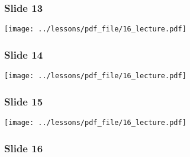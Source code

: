 \documentclass[../main/main.tex]{subfiles}
\begin{document}
\subsubsection*{Slide 13}

\begin{minipage}[]{0.5\linewidth}
\centering
\texttt{[image: ../lessons/pdf\_file/16\_lecture.pdf]}
\end{minipage}
\hspace{0.3cm}\vspace{0.3cm}
\begin{minipage}[c]{0.47\linewidth}



\end{minipage}

\subsubsection*{Slide 14}

\begin{minipage}[]{0.5\linewidth}
\centering
\texttt{[image: ../lessons/pdf\_file/16\_lecture.pdf]}
\end{minipage}
\hspace{0.3cm}\vspace{0.3cm}
\begin{minipage}[c]{0.47\linewidth}



\end{minipage}

\subsubsection*{Slide 15}

\begin{minipage}[]{0.5\linewidth}
\centering
\texttt{[image: ../lessons/pdf\_file/16\_lecture.pdf]}
\end{minipage}
\hspace{0.3cm}\vspace{0.3cm}
\begin{minipage}[c]{0.47\linewidth}



\end{minipage}

\subsubsection*{Slide 16}
\end{document}
